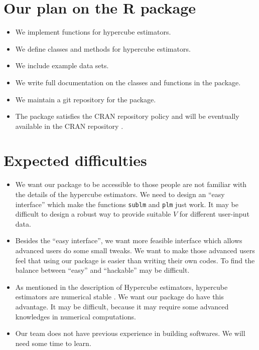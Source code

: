 \documentclass[draft]{article}
\begin{document}
\section{Our plan on the R package}

\begin{itemize}

	\item We implement functions for hypercube estimators.

	\item We define classes and methods for hypercube estimators.

	\item We include example data sets.

	\item We write full documentation on the classes and functions in the package.

	\item We maintain a git repository for the package.

	\item The package satisfies the CRAN repository policy and will be eventually available in the CRAN repository .

\end{itemize}

\section{Expected difficulties}
\begin{itemize}

	\item We want our package to be accessible to those people are not familiar with the details of the hypercube estimators. We need to design an ``easy interface'' which make the functions {\tt sublm} and {\tt plm} just work. It may be difficult to design a robust way to provide suitable $V$ for different user-input data.

	\item Besides the ``easy interface'', we want more feasible interface which allows advanced users do some small tweaks. We want to make those advanced users feel that using our package is easier than writing their own codes. To find the balance between ``easy'' and ``hackable'' may be difficult.

	\item As mentioned in the description of Hypercube estimators, hypercube estimators are numerical stable \cite{beran2014hypercube}. We want our package do have this advantage. It may be difficult, because it may require some advanced knowledges in numerical computations.

	\item Our team does not have previous experience in building softwares. We will need some time to learn.

\end{itemize}
\end{document}
